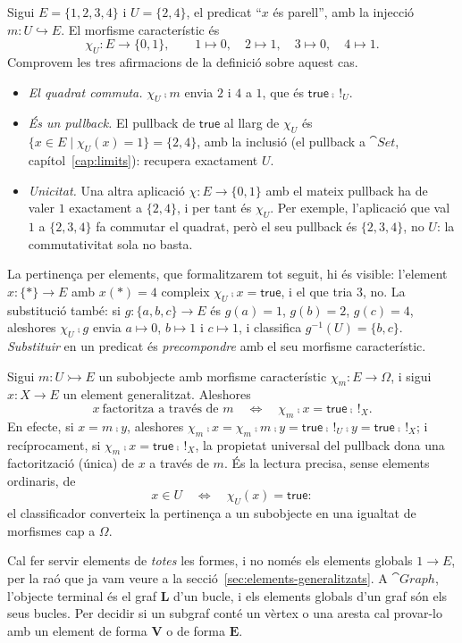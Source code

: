 \begin{exemple}\label{ex:caracteristic-set}
Sigui $E=\{1,2,3,4\}$ i $U=\{2,4\}$, el predicat \enquote{$x$ és parell}, amb la injecció $m\colon U\hookrightarrow E$. El morfisme característic és
\[
\chi_U\colon E\to\{0,1\},\qquad 1\mapsto0,\quad 2\mapsto1,\quad 3\mapsto0,\quad 4\mapsto1.
\]
Comprovem les tres afirmacions de la definició sobre aquest cas.
\begin{itemize}
\item \emph{El quadrat commuta.} $\chi_U\comp m$ envia $2$ i $4$ a $1$, que és $\mathsf{true}\comp\,!_U$.
\item \emph{És un pullback.} El pullback de $\mathsf{true}$ al llarg de $\chi_U$ és $\{x\in E\mid\chi_U(x)=1\}=\{2,4\}$, amb la inclusió (el pullback a $\cat{Set}$, capítol~\ref{cap:limits}): recupera exactament $U$.
\item \emph{Unicitat.} Una altra aplicació $\chi\colon E\to\{0,1\}$ amb el mateix pullback ha de valer $1$ exactament a $\{2,4\}$, i per tant és $\chi_U$. Per exemple, l'aplicació que val $1$ a $\{2,3,4\}$ fa commutar el quadrat, però el seu pullback és $\{2,3,4\}$, no $U$: la commutativitat sola no basta.
\end{itemize}
La pertinença per elements, que formalitzarem tot seguit, hi és visible: l'element $x\colon\{\ast\}\to E$ amb $x(\ast)=4$ compleix $\chi_U\comp x=\mathsf{true}$, i el que tria $3$, no. La substitució també: si $g\colon\{a,b,c\}\to E$ és $g(a)=1$, $g(b)=2$, $g(c)=4$, aleshores $\chi_U\comp g$ envia $a\mapsto0$, $b\mapsto1$ i $c\mapsto1$, i classifica $g^{-1}(U)=\{b,c\}$. \emph{Substituir} en un predicat és \emph{precompondre} amb el seu morfisme característic.
\end{exemple}

\begin{observacio}
Sigui $m\colon U\rightarrowtail E$ un subobjecte amb morfisme característic $\chi_m\colon E\to\Omega$, i sigui $x\colon X\to E$ un element generalitzat. Aleshores
\[
x\ \text{factoritza a través de } m
\quad\Longleftrightarrow\quad
\chi_m\comp x=\mathsf{true}\comp\,!_X.
\]
En efecte, si $x=m\comp y$, aleshores $\chi_m\comp x=\chi_m\comp m\comp y=\mathsf{true}\comp\,!_U\comp y=\mathsf{true}\comp\,!_X$; i recíprocament, si $\chi_m\comp x=\mathsf{true}\comp\,!_X$, la propietat universal del pullback dona una factorització (única) de $x$ a través de $m$. És la lectura precisa, sense elements ordinaris, de
\[
x\in U\quad\Longleftrightarrow\quad\chi_U(x)=\mathsf{true}:
\]
el classificador converteix la pertinença a un subobjecte en una igualtat de morfismes cap a $\Omega$.

Cal fer servir elements de \emph{totes} les formes, i no només els elements globals $1\to E$, per la raó que ja vam veure a la secció~\ref{sec:elements-generalitzats}. A $\cat{Graph}$, l'objecte terminal és el graf $\mathbf L$ d'un bucle, i els elements globals d'un graf són els seus bucles. Per decidir si un subgraf conté un vèrtex o una aresta cal provar-lo amb un element de forma $\mathbf V$ o de forma $\mathbf E$.
\end{observacio}

